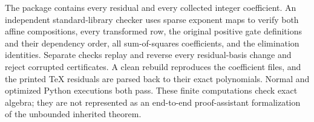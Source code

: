 The package contains every residual and every collected integer
coefficient.  An independent standard-library checker uses sparse
exponent maps to verify both affine compositions, every transformed row,
the original positive gate definitions and their dependency order, all
sum-of-squares coefficients, and the elimination identities.  Separate
checks replay and reverse every residual-basis change and reject corrupted
certificates.  A clean rebuild reproduces the coefficient files, and the
printed TeX residuals are parsed back to their exact polynomials.  Normal
and optimized Python executions both pass.  These finite computations
check exact algebra; they are not represented as an end-to-end
proof-assistant formalization of the unbounded inherited theorem.
